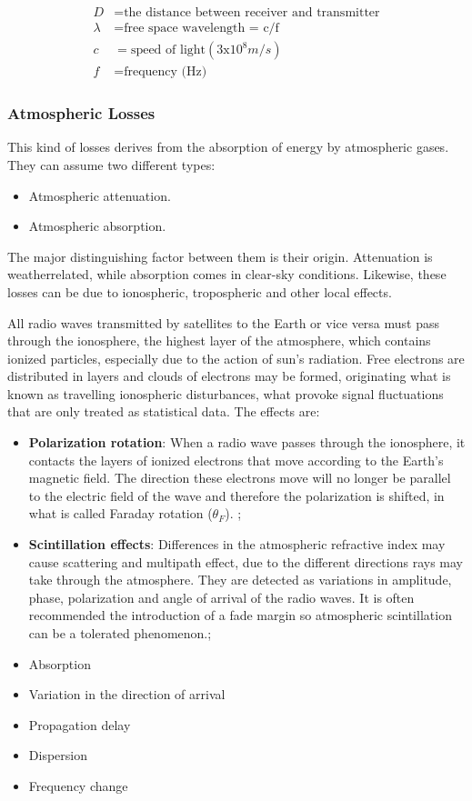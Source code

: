 \begin{align*}
	D&= \text{the distance between receiver and transmitter}\\
	\lambda&= \text{free space wavelength = c/f}\\
	c&= \text{speed of light}(3\mathrm{x}10^8m/s)\\
	f&= \text{frequency (Hz)}
\end{align*}

\subsubsection{Atmospheric Losses}
This kind of losses derives from the absorption of energy by atmospheric gases. They can assume two different types:

\begin{itemize}
	\item Atmospheric attenuation.
	\item Atmospheric absorption.
\end{itemize}

The major distinguishing factor between them is their origin. Attenuation is weatherrelated, while absorption comes in clear-sky conditions.
Likewise, these losses can be due to ionospheric, tropospheric and other local effects. \cite{Jorge2012}

All radio waves transmitted by satellites to the Earth or vice versa must pass through the
ionosphere, the highest layer of the atmosphere, which contains ionized particles,
especially due to the action of sun’s radiation. Free electrons are distributed in layers
and clouds of electrons may be formed, originating what is known as travelling
ionospheric disturbances, what provoke signal fluctuations that are only treated as
statistical data. The effects are:

\begin{itemize}
	\item \textbf{Polarization rotation}: When a radio wave passes through the ionosphere, it contacts the layers of ionized 	electrons that move according to the Earth’s magnetic field. The direction these 	electrons move will no longer be parallel to the electric field of the wave and therefore	the polarization is shifted, in what is called Faraday rotation ($\theta_F$). ;
	\item \textbf{Scintillation effects}: Differences in the atmospheric refractive index may cause scattering and multipath 	effect, due to the different directions rays may take through the atmosphere. They are detected as variations in amplitude, phase, polarization and angle of arrival of	the radio waves.	It is often recommended the introduction of a fade margin so atmospheric scintillation
	can be a tolerated phenomenon.; 
	\item Absorption
	\item Variation in the direction of arrival
	\item Propagation delay
	\item Dispersion
	\item Frequency change
\end{itemize}

